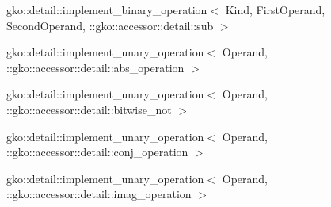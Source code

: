 \begin{DoxyCompactList}
\begin{DoxyCompactList}
\item {}
\end{DoxyCompactList}
\item gko\+:\+:detail\+:\+:implement\+\_\+binary\+\_\+operation$<$ Kind, First\+Operand, Second\+Operand, \+:\+:gko\+:\+:accessor\+:\+:detail\+:\+:sub $>$\begin{DoxyCompactList}
\item {}
\end{DoxyCompactList}
\item gko\+:\+:detail\+:\+:implement\+\_\+unary\+\_\+operation$<$ Operand, \+:\+:gko\+:\+:accessor\+:\+:detail\+:\+:abs\+\_\+operation $>$\begin{DoxyCompactList}
\item {}
\end{DoxyCompactList}
\item gko\+:\+:detail\+:\+:implement\+\_\+unary\+\_\+operation$<$ Operand, \+:\+:gko\+:\+:accessor\+:\+:detail\+:\+:bitwise\+\_\+not $>$\begin{DoxyCompactList}
\item {}
\end{DoxyCompactList}
\item gko\+:\+:detail\+:\+:implement\+\_\+unary\+\_\+operation$<$ Operand, \+:\+:gko\+:\+:accessor\+:\+:detail\+:\+:conj\+\_\+operation $>$\begin{DoxyCompactList}
\item {}
\end{DoxyCompactList}
\item gko\+:\+:detail\+:\+:implement\+\_\+unary\+\_\+operation$<$ Operand, \+:\+:gko\+:\+:accessor\+:\+:detail\+:\+:imag\+\_\+operation $>$\begin{DoxyCompactList}
\item {}

\end{DoxyCompactList}
\end{DoxyCompactList}
